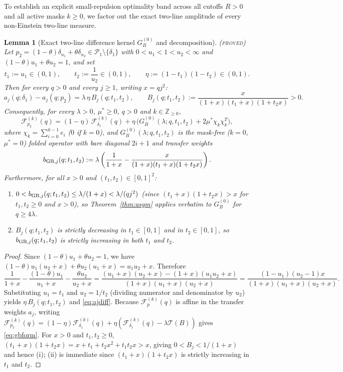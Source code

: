 \documentclass[11pt]{article}
\newcommand{\Fcal}{\mathcal F}
\newcommand{\muS}{\mu^{*}}
\newtheorem{lemma}[theorem]{Lemma}
\theoremstyle{definition}
\theoremstyle{remark}
\newcommand{\proved}{\textnormal{\textsc{(proved)}}}
\begin{document}
To establish an explicit small-repulsion optimality band across all cutoffs $R>0$ and all
active masks $k\ge0$, we factor out the exact two-line amplitude of every non-Einstein
two-line measure.

\begin{lemma}[Exact two-line difference kernel $G_B^{(0)}$ and decomposition]
\label{lem:gb}\proved
Let $p_2=(1-\theta)\delta_{u_1}+\theta\delta_{u_2}\in\mathcal P_1\setminus\{\delta_1\}$
with $0<u_1<1<u_2<\infty$ and $(1-\theta)u_1+\theta u_2=1$, and set
\[
t_1:=u_1\in(0,1),\qquad t_2:=\frac{1}{u_2}\in(0,1),\qquad
\eta:=(1-t_1)(1-t_2)\in(0,1).
\]
Then for every $q>0$ and every $j\ge1$, writing $x=qj^2$:
\begin{equation}\label{eq:ajdiff}
a_j(q;\delta_1)-a_j(q;p_2)=\lambda\,\eta\,B_j(q;t_1,t_2),\qquad
B_j(q;t_1,t_2):=\frac{x}{(1+x)(t_1+x)(1+t_2x)}>0.
\end{equation}
Consequently, for every $\lambda>0$, $\muS\ge0$, $q>0$ and $k\in\mathbb Z_{\ge0}$,
\begin{equation}\label{eq:gbform}
\Fcal_{p_2}^{(k)}(q)=(1-\eta)\,\Fcal_{\delta_1}^{(k)}(q)
+\eta\,\Big(G_B^{(0)}(\lambda;q,t_1,t_2)+2\muS\chi_k\chi_k^T\Big),
\end{equation}
where $\chi_k=\sum_{i=0}^{k-1}e_i$ ($0$ if $k=0$), and $G_B^{(0)}(\lambda;q,t_1,t_2)$ is
the mask-free ($k=0$, $\muS=0$) folded operator with bare diagonal $2i+1$ and transfer
weights
\begin{equation}\label{eq:bgb}
b_{{\rm GB},j}(q;t_1,t_2):=\lambda\left(\frac{1}{1+x}
-\frac{x}{(1+x)(t_1+x)(1+t_2x)}\right).
\end{equation}
Furthermore, for all $x>0$ and $(t_1,t_2)\in[0,1]^2$:
\begin{enumerate}[label=(\roman*),leftmargin=2.2em]
\item $0<b_{{\rm GB},j}(q;t_1,t_2)\le\lambda/(1+x)<\lambda/(qj^2)$ (since
$(t_1+x)(1+t_2x)>x$ for $t_1,t_2\ge0$ and $x>0$), so Theorem~\ref{thm:asym} applies
verbatim to $G_B^{(0)}$ for $q\ge4\lambda$.
\item $B_j(q;t_1,t_2)$ is strictly decreasing in $t_1\in[0,1]$ and in $t_2\in[0,1]$, so
$b_{{\rm GB},j}(q;t_1,t_2)$ is strictly increasing in both $t_1$ and $t_2$.
\end{enumerate}
\end{lemma}

\begin{proof}
Since $(1-\theta)u_1+\theta u_2=1$, we have $(1-\theta)u_1(u_2+x)+\theta u_2(u_1+x)=u_1u_2+x$.
Therefore
\[
\frac{1}{1+x}-\frac{(1-\theta)u_1}{u_1+x}-\frac{\theta u_2}{u_2+x}
=\frac{(u_1+x)(u_2+x)-(1+x)(u_1u_2+x)}{(1+x)(u_1+x)(u_2+x)}
=\frac{(1-u_1)(u_2-1)x}{(1+x)(u_1+x)(u_2+x)}.
\]
Substituting $u_1=t_1$ and $u_2=1/t_2$ (dividing numerator and denominator by $u_2$) yields
$\eta\,B_j(q;t_1,t_2)$ and \eqref{eq:ajdiff}. Because $\Fcal_p^{(k)}(q)$ is affine in the
transfer weights $a_j$, writing
$\Fcal_{p_2}^{(k)}(q)=(1-\eta)\Fcal_{\delta_1}^{(k)}(q)+\eta(\Fcal_{\delta_1}^{(k)}(q)-\lambda\mathcal T(B))$
gives \eqref{eq:gbform}. For $x>0$ and $t_1,t_2\ge0$, $(t_1+x)(1+t_2x)=x+t_1+t_2x^2+t_1t_2x>x$,
giving $0<B_j<1/(1+x)$ and hence (i); (ii) is immediate since $(t_1+x)(1+t_2x)$ is strictly
increasing in $t_1$ and $t_2$.
\end{proof}
\end{document}
